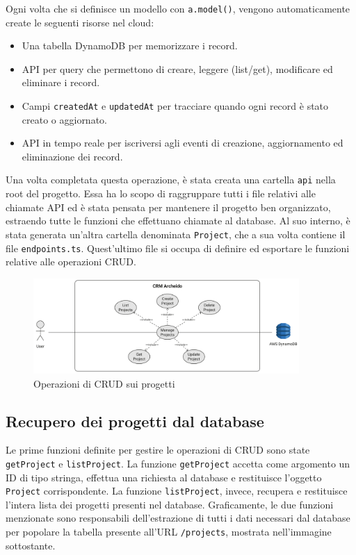 \documentclass[target=bach,aauheader=,style=]{thud}
\begin{document}
\noindent Ogni volta che si definisce un modello con \texttt{a.model()}, vengono automaticamente create le seguenti risorse nel cloud:
\begin{itemize}
    \item Una tabella DynamoDB per memorizzare i record.
    \item API per query che permettono di creare, leggere (list/get), modificare ed eliminare i record.
    \item Campi \texttt{createdAt} e \texttt{updatedAt} per tracciare quando ogni record è stato creato o aggiornato.
    \item API in tempo reale per iscriversi agli eventi di creazione, aggiornamento ed eliminazione dei record.
\end{itemize}
\noindent Una volta completata questa operazione, è stata creata una cartella \texttt{api} nella root del progetto. Essa ha lo scopo di raggruppare tutti i file relativi alle chiamate API ed è stata pensata per mantenere il progetto ben organizzato, estraendo tutte le funzioni che effettuano chiamate al database. Al suo interno, è stata generata un'altra cartella denominata \texttt{Project}, che a sua volta contiene il file \texttt{endpoints.ts}. Quest'ultimo file si occupa di definire ed esportare le funzioni relative alle operazioni CRUD.

\begin{figure}[H]
    \centering
    \includegraphics[width=0.9\textwidth]{img/diagrammi/use_case_manage_projects.pdf} 
    \caption{Operazioni di CRUD sui progetti}
\end{figure}

\subsection{Recupero dei progetti dal database}
\noindent Le prime funzioni definite per gestire le operazioni di CRUD sono state \texttt{getProject} e \texttt{listProject}. La funzione \texttt{getProject} accetta come argomento un ID di tipo stringa, effettua una richiesta al database e restituisce l'oggetto \texttt{Project} corrispondente. La funzione \texttt{listProject}, invece, recupera e restituisce l'intera lista dei progetti presenti nel database. Graficamente, le due funzioni menzionate sono responsabili dell'estrazione di tutti i dati necessari dal database per popolare la tabella presente all'URL \texttt{/projects}, mostrata nell'immagine sottostante.
\end{document}
